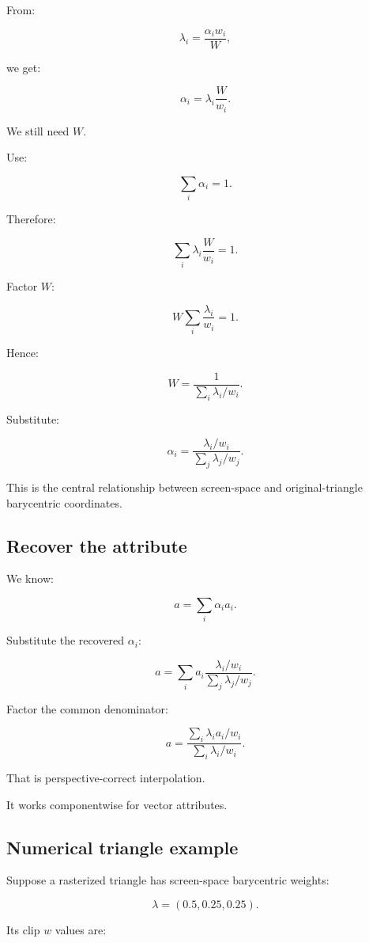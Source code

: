 From:

\[
 \lambda_i=\frac{\alpha_iw_i}{W},
\]

we get:

\[
 \alpha_i=\lambda_i\frac W{w_i}.
\]

We still need \(W\).

Use:

\[
 \sum_i\alpha_i=1.
\]

Therefore:

\[
 \sum_i\lambda_i\frac W{w_i}=1.
\]

Factor \(W\):

\[
 W\sum_i\frac{\lambda_i}{w_i}=1.
\]

Hence:

\[
 \boxed{ W= \frac1{\sum_i\lambda_i/w_i} }.
\]

Substitute:

\[
 \boxed{ \alpha_i= \frac{\lambda_i/w_i} {\sum_j\lambda_j/w_j} }.
\]

This is the central relationship between screen-space and original-triangle barycentric coordinates.

\subsection{Recover the attribute}\label{02-foundations-ii-ch034-recover-the-attribute}

We know:

\[
 a=\sum_i\alpha_i a_i.
\]

Substitute the recovered \(\alpha_i\):

\[
 a= \sum_i a_i \frac{\lambda_i/w_i} {\sum_j\lambda_j/w_j}.
\]

Factor the common denominator:

\[
 \boxed{ a= \frac{ \sum_i\lambda_i a_i/w_i }{ \sum_i\lambda_i/w_i } }.
\]

That is perspective-correct interpolation.

It works componentwise for vector attributes.

\subsection{Numerical triangle example}\label{02-foundations-ii-ch034-numerical-triangle-example}

Suppose a rasterized triangle has screen-space barycentric weights:

\[
 \lambda=(0.5,0.25,0.25).
\]

Its clip \(w\) values are:

